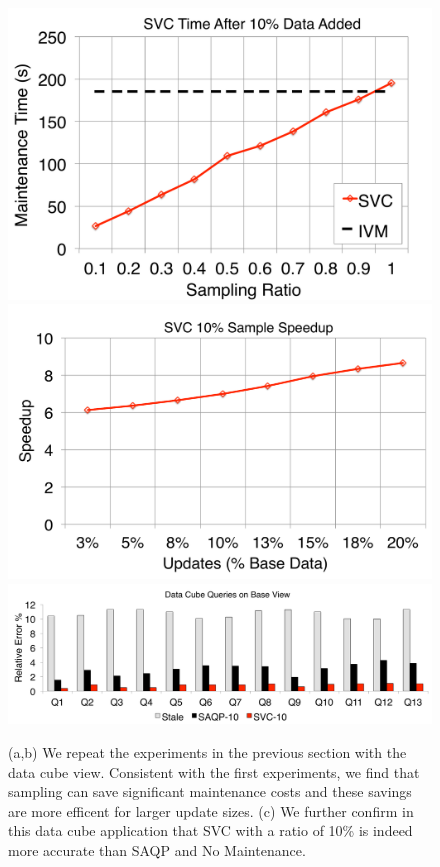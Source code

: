 \begin{figure}[t]
\centering
 \includegraphics[scale=0.14]{exp/msdc_1.pdf}
 \includegraphics[scale=0.14]{exp/msdc_2.pdf}
  \includegraphics[scale=0.16]{exp/msdc_3.pdf}
   \caption{(a,b) We repeat the experiments in the previous section with the data cube view. Consistent with the first experiments, we find that sampling can save significant maintenance costs and these savings are more efficent for larger update sizes. (c) We further confirm in this data cube application that SVC with a ratio of 10\% is indeed more accurate than SAQP and No Maintenance. \label{exp2-acc-sample}}
\end{figure}

